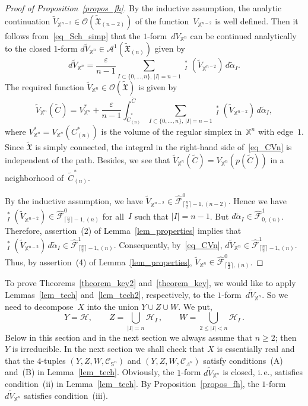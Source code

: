 \documentclass[reqno,tbtags,12pt]{amsart}
\numberwithin{equation}{section}
\newcommand{\CH}{\mathcal{H}}
\newcommand{\CC}{\mathcal{C}}
\newcommand{\X}{\mathbb{X}}
\newcommand{\tFX}{\widetilde{\mathfrak{X}}}
\newcommand{\hCF}{\widehat{\mathcal{F}}}
\newcommand{\CO}{\mathcal{O}}
\newcommand{\bS}{\mathbb{S}}
\newcommand{\A}{\mathcal{A}}
\newcommand{\tV}{\widetilde{V}}
\newcommand{\talpha}{\widetilde{\alpha}}
\newcommand{\tC}{\widetilde{C}}
\newcommand{\tpr}{\mathop{\widetilde{\mathrm{pr}}}\nolimits}
\theoremstyle{definition}
\begin{document}
\begin{proof}[Proof of Proposition~\ref{propos_fh}]
By the inductive assumption, the analytic continuation $\tV_{\X^{n-2}}\in\CO(\tFX_{(n-2)})$ of the function~$V_{\X^{n-2}}$ is well defined. Then
it follows from~\eqref{eq_Sch_simp} that the $1$-form~$dV_{\X^n}$ can be continued analytically to the closed $1$-form $d\tV_{\X^n}\in\A^1(\tFX_{(n)})$ given by
\begin{equation}\label{eq_dCVn}
d\tV_{\X^n}=\frac{\varepsilon}{n-1}\sum_{I\subset\{0,\ldots,n\},\,|I|=n-1}\tpr_I^*(\tV_{\X^{n-2}})\,d\talpha_I.
\end{equation}
 The required function $\tV_{\X^n}\in\CO(\tFX)$ is given by 
\begin{equation}\label{eq_CVn}
\tV_{\X^n}(\tC)=V^*_{\X^n}+\frac{\varepsilon}{n-1}\int_{\tC^*_{(n)}}^{\tC}\sum_{I\subset\{0,\ldots,n\},\,|I|=n-1}\tpr_I^*(\tV_{\X^{n-2}})\,d\talpha_I,
\end{equation}
where $V^*_{\X^n}=V_{\X^n}(C^*_{(n)})$ is the volume of the regular simplex in~$\X^n$ with edge~$1$. 
Since $\tFX$ is simply connected, the integral in the right-hand side of~\eqref{eq_CVn} is  independent of the path. Besides, we see that $\tV_{\X^n}(\widetilde{C})=V_{\X^n}(p(\widetilde{C}))$ in a neighborhood of~$\tC^*_{(n)}$.

By the inductive assumption, we have $\tV_{\X^{n-2}}\in\hCF^0_{\lceil\frac{n}{2}\rceil-1,(n-2)}$. Hence we have $\tpr_I^*(\tV_{\X^{n-2}})\in\hCF^0_{\lceil\frac{n}{2}\rceil-1,(n)}$ for all~$I$ such that $|I|=n-1$. But $d\talpha_I\in\hCF^1_{0,(n)}$. Therefore, assertion~(2) of Lemma~\ref{lem_properties} implies that $\tpr_I^*(\tV_{\X^{n-2}})\,d\talpha_I\in \hCF^1_{\lceil\frac{n}{2}\rceil-1,(n)}$. Consequently, by~\eqref{eq_CVn}, $d \tV_{\X^n}\in\hCF^1_{\lceil\frac{n}{2}\rceil-1,(n)}$. Thus, by  assertion~(4) of Lemma~\ref{lem_properties}, $\tV_{\X^n}\in\hCF^0_{\lceil\frac{n}{2}\rceil,(n)}$.
\end{proof}



To prove Theorems~\ref{theorem_key2} and~\ref{theorem_key}, we would like to apply Lemmas~\ref{lem_tech}  and~\ref{lem_tech2}, respectively, to the $1$-form~$d\tV_{\X^n}$. 
So we need to decompose~$X$ into the union $Y\cup Z\cup W$. We put,
$$
Y=\CH,\qquad Z=\bigcup_{|I|=n}\CH_I\,,\qquad W=\bigcup_{2\le |I|<n}\CH_I\,.
$$
Below in this section and in the next section we always assume that $n\ge 2$; then $Y$ is irreducible.
In the next section we shall check that $X$ is essentially real and that the $4$-tuples $(Y,Z,W,\CC_{\bS^n})$ and $(Y,Z,W,\CC_{\Lambda^n})$ satisfy conditions~(A) and~(B) in Lemma~\ref{lem_tech}.
Obviously, the $1$-form $d\tV_{\X^n}$ is closed, i.\,e., satisfies condition~(ii) in Lemma~\ref{lem_tech}. By Proposition~\ref{propos_fh}, the $1$-form $d\tV_{\X^n}$ satisfies condition~(iii).
\end{document}
